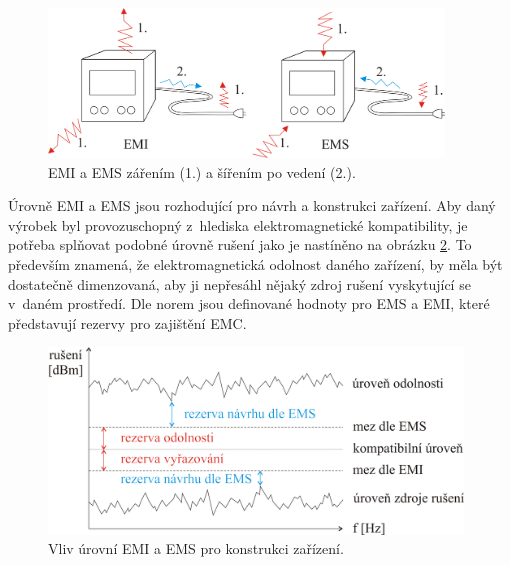 \begin{figure}[!h]
	\centering
	\includegraphics[width=10.5cm]{emc_emi_ems.png}
	\caption{EMI a EMS zářením (1.) a šířením po vedení (2.).}
	\label{obr:emc_emi_ems}
\end{figure}

Úrovně EMI a EMS jsou rozhodující pro návrh a konstrukci zařízení. Aby daný výrobek byl provozuschopný z~hlediska elektromagnetické kompatibility, je potřeba splňovat podobné úrovně rušení jako je nastíněno na obrázku \ref{obr:emc_meze}. To především znamená, že elektromagnetická odolnost daného zařízení, by měla být dostatečně dimenzovaná, aby ji nepřesáhl nějaký zdroj rušení vyskytující se v~daném prostředí. Dle norem jsou definované hodnoty pro EMS a EMI, které představují rezervy pro zajištění EMC.
\begin{figure}[!h]
	\centering
	\includegraphics[width=11cm]{emc_meze.png}
	\caption{Vliv úrovní EMI a EMS pro konstrukci zařízení.}
	\label{obr:emc_meze}
\end{figure}


